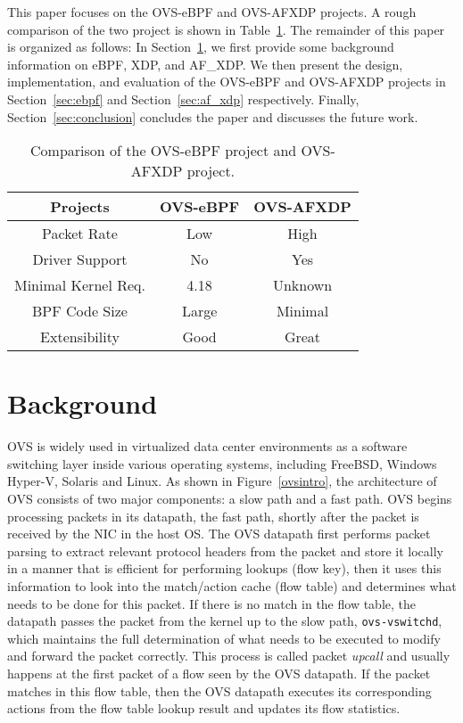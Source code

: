 \documentclass[10pt]{sigplanconf}
\begin{document}
This paper focuses on the OVS-eBPF and OVS-AFXDP projects.
A rough comparison of the two project is shown in Table~\ref{proj-compare}.
The remainder of this paper is organized as follows:
In Section~\ref{sec:background}, we first provide some background information
on eBPF, XDP, and AF\_XDP.  We then present the design, implementation, and
evaluation of the OVS-eBPF and OVS-AFXDP projects in Section~\ref{sec:ebpf}
and Section~\ref{sec:af_xdp} respectively. Finally,
Section~\ref{sec:conclusion} concludes the paper and discusses the future work.

\begin{table}
\centering
\scriptsize
\begin{tabular}{|c | c | c|}
\hline
 {\bf Projects} & {\bf OVS-eBPF } & {\bf OVS-AFXDP} \\ \hline\hline
  Packet Rate & Low & High \\ \hline
  Driver Support & No & Yes \\ \hline
  Minimal Kernel Req. & 4.18 & Unknown \\ \hline
  BPF Code Size & Large & Minimal \\ \hline
  Extensibility & Good & Great \\ \hline
  \end{tabular}
\caption{\footnotesize
Comparison of the OVS-eBPF project and OVS-AFXDP project.
}
\label{proj-compare}
\end{table}

\section{Background}
\label{sec:background}

OVS is widely used in virtualized data center environments as a software
switching layer inside various operating systems, including FreeBSD,
Windows Hyper-V, Solaris and Linux. As shown in
Figure~\ref{ovsintro}, the architecture of OVS consists of two major
components: a slow path and a fast path. OVS begins processing packets
in its datapath, the fast path, shortly after the packet is received by the NIC in the host OS.
The OVS datapath first performs packet parsing to extract relevant protocol
headers from the packet and store it locally in a manner that is efficient for
performing lookups (flow key), then it uses this information to look into the
match/action cache (flow table) and determines what needs to be done for this
packet. If there is no match in the flow table, the datapath passes the packet
from the kernel up to the slow path, \verb+ovs-vswitchd+, which maintains the
full determination of what needs to be executed to modify and forward
the packet correctly.  This process is called packet {\em upcall} and
usually happens at the first packet of a flow seen by the OVS datapath.
If the packet matches in this flow table, then the OVS datapath executes its
corresponding actions from the flow table lookup result and updates its flow
statistics.
\end{document}
